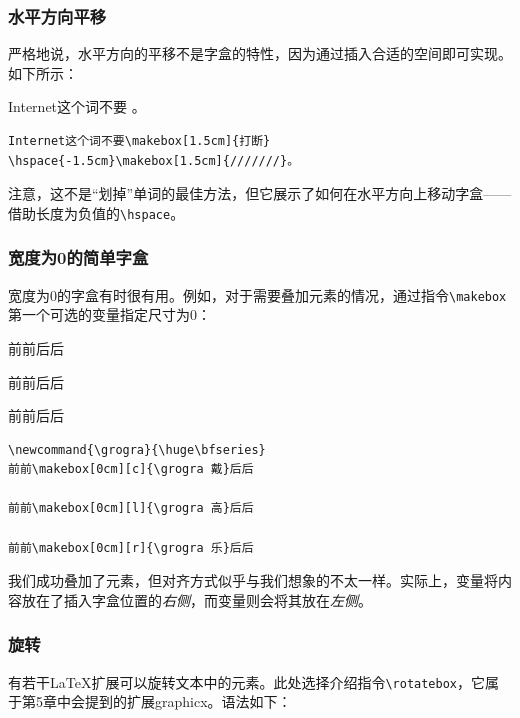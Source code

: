 \subsubsection{水平方向平移}

严格地说，水平方向的平移不是字盒的特性，因为通过插入合适的空间即可实现。如下所示：

\begin{codelist}[4.13]{
  Internet这个词不要
\hspace{-1.5cm}\makebox[1.5cm]{///////}。
}
\begin{verbatim}
Internet这个词不要\makebox[1.5cm]{打断}
\hspace{-1.5cm}\makebox[1.5cm]{///////}。\end{verbatim}
\end{codelist}

注意，这不是“划掉”单词的最佳方法，但它展示了如何在水平方向上移动字盒——借助长度为负值的\verb|\hspace|。

\subsubsection{宽度为0的简单字盒}

宽度为0的字盒有时很有用。例如，对于需要叠加元素的情况，通过指令\verb|\makebox|第一个可选的变量指定尺寸为0：

\begin{codelist}[4.14]{
  \newcommand{\grogra}{\huge\bfseries}
前前\makebox[0cm][c]{\grogra 戴}后后

前前\makebox[0cm][l]{\grogra 高}后后

前前\makebox[0cm][r]{\grogra 乐}后后
}
\begin{verbatim}
\newcommand{\grogra}{\huge\bfseries}
前前\makebox[0cm][c]{\grogra 戴}后后

前前\makebox[0cm][l]{\grogra 高}后后

前前\makebox[0cm][r]{\grogra 乐}后后\end{verbatim}
\end{codelist}

我们成功叠加了元素，但对齐方式似乎与我们想象的不太一样。实际上，变量将内容放在了插入字盒位置的\emph{右侧}，而变量则会将其放在\emph{左侧}。

\subsubsection{旋转}

有若干\LaTeX 扩展可以旋转文本中的元素。此处选择介绍指令\verb|\rotatebox|，它属于第5章中会提到的扩展\textsf{graphicx}。语法如下：

